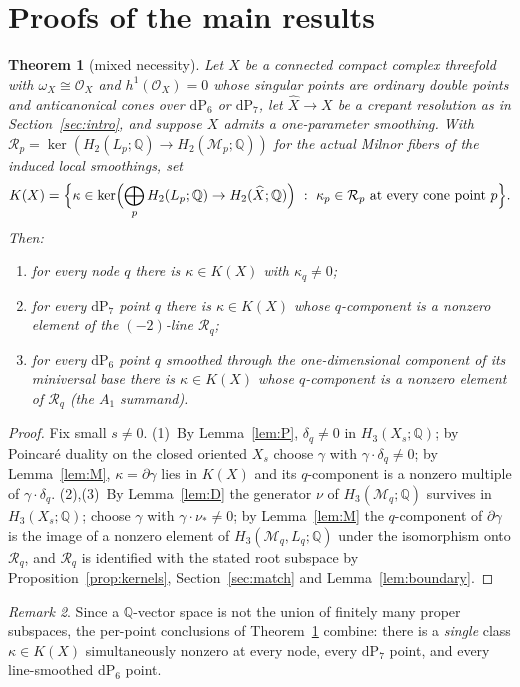 \documentclass[11pt]{amsart}
\newtheorem{theorem}{Theorem}[section]
\theoremstyle{definition}
\theoremstyle{remark}
\newtheorem{remark}[theorem]{Remark}
\theoremstyle{plain}
\newcommand{\QQ}{\mathbb{Q}}
\newcommand{\cO}{\mathcal{O}}
\newcommand{\Rsm}{\mathcal{R}}   %
\newcommand{\Mil}{\mathcal{M}}  %
\newcommand{\dP}{\mathrm{dP}}
\newcommand{\Xh}{\widehat{X}}
\begin{document}
\section{Proofs of the main results}\label{sec:proofs}

\begin{theorem}[mixed necessity]\label{thm:necessity}
Let $X$ be a connected compact complex threefold with $\omega_X\cong\cO_X$ and
$h^1(\cO_X)=0$ whose singular points are ordinary double points and
anticanonical cones over $\dP_6$ or $\dP_7$, let
$\Xh\to X$ be a crepant resolution as in
Section~\ref{sec:intro}, and suppose $X$ admits a one-parameter
smoothing.  With $\Rsm_p=\ker(H_2(L_p;\QQ)\to H_2(\Mil_p;\QQ))$ for the
actual Milnor fibers of the induced local smoothings, set
\[
K(X)=\Bigl\{\kappa\in\ker\Bigl(\bigoplus_pH_2(L_p;\QQ)
\to H_2(\Xh;\QQ)\Bigr)\ :\ \kappa_p\in \Rsm_p
\text{ at every cone point }p\Bigr\}.
\]
Then:
\begin{enumerate}
\item for every node $q$ there is $\kappa\in K(X)$ with
$\kappa_q\neq0$;
\item for every $\dP_7$ point $q$ there is $\kappa\in K(X)$ whose
$q$-component is a nonzero element of the $(-2)$-line $\Rsm_q$;
\item for every $\dP_6$ point $q$ smoothed through the one-dimensional
component of its miniversal base there is $\kappa\in K(X)$ whose
$q$-component is a nonzero element of $\Rsm_q$ (the $A_1$ summand).
\end{enumerate}
\end{theorem}

\begin{proof}
Fix small $s\neq0$.  (1)~By Lemma~\ref{lem:P}, $\delta_q\neq0$ in
$H_3(X_s;\QQ)$; by Poincar\'e duality on the closed oriented $X_s$
choose $\gamma$ with $\gamma\cdot\delta_q\neq0$; by
Lemma~\ref{lem:M}, $\kappa=\partial\gamma$ lies in $K(X)$ and its
$q$-component is a nonzero multiple of $\gamma\cdot\delta_q$.
(2),(3)~By Lemma~\ref{lem:D} the generator $\nu$ of
$H_3(\Mil_q;\QQ)$ survives in $H_3(X_s;\QQ)$; choose $\gamma$ with
$\gamma\cdot\nu_*\neq0$; by Lemma~\ref{lem:M} the $q$-component of
$\partial\gamma$ is the image of a nonzero element of
$H_3(\Mil_q,L_q;\QQ)$ under the isomorphism onto $\Rsm_q$, and $\Rsm_q$ is
identified with the stated root subspace by
Proposition~\ref{prop:kernels}, Section~\ref{sec:match} and
Lemma~\ref{lem:boundary}.
\end{proof}

\begin{remark}\label{rem:single}
Since a $\QQ$-vector space is not the union of finitely many proper
subspaces, the per-point conclusions of
Theorem~\ref{thm:necessity} combine: there is a \emph{single} class
$\kappa\in K(X)$ simultaneously nonzero at every node, every
$\dP_7$ point, and every line-smoothed $\dP_6$ point.
\end{remark}
\end{document}
